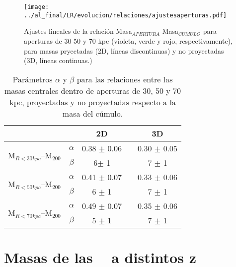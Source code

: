 \begin{figure}[H]
 \centering
 \texttt{[image: ../al\_final/LR/evolucion/relaciones/ajustesaperturas.pdf]}
\caption{Ajustes lineales de la relaci\'on Masa$_{APERTURA}$-Masa$_{CUMULO}$ para aperturas de 30
50 y 70 kpc (violeta, verde y rojo, respectivamente), para masas pryectadas (2D, l\'ineas discontinuas)
y no proyectadas (3D, l\'ineas continuas.)
}
\label{fig:app}
\end{figure}

\begin{table}[H]
\centering
\begin{tabular}{c|c|c c c}
\hline
& &2D&& 3D\\
\hline
\multirow{2}{*}{M$_{R<30kpc}$--M$_{200}$} &$\alpha$ & 0.38 $\pm$ 0.06  && 0.30 $\pm$ 0.05 \\
                                          &$\beta$  & 6$\pm$ 1         && 7 $\pm$ 1   \\
\hline
\multirow{2}{*}{M$_{R<50kpc}$--M$_{200}$} &$\alpha$ & 0.41 $\pm$  0.07 &&  0.33 $\pm$ 0.06 \\
                                          &$\beta$  & 6 $\pm$ 1        &&  7 $\pm$ 1\\
\hline
\multirow{2}{*}{M$_{R<70kpc}$--M$_{200}$} &$\alpha$ & 0.49 $\pm$  0.07 &&  0.35 $\pm$ 0.06 \\
                                          &$\beta$  & 5 $\pm$ 1        && 7 $\pm$ 1\\
\hline
\end{tabular}
\caption{Par\'ametros $\alpha$ y $\beta$ para las relaciones entre las masas centrales dentro de 
aperturas de 30, 50 y 70 kpc, proyectadas y no proyectadas respecto a la masa del c\'umulo.}\label{tab:2}
\end{table}


\section{Masas de las \bcgs~ a distintos z}
\label{sec:variosz}

